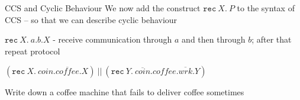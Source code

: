 \documentclass{beamer}
\begin{document}
\begin{frame}{CCS and Cyclic Behaviour}
  We now add the construct \alert{$\mathtt{rec}\ X.\ P$} to the syntax of CCS -- so that we
  can describe cyclic behaviour

  \vfill
  \begin{example}
    $\mathtt{rec}\ X.\ a . b . X$  - receive communication through $a$ and then
    through $b$; after that repeat protocol
  \end{example}

  \begin{example}
    $(\mathtt{rec}\ X.\ coin . \overline{coffee} . X)\ ||\ (\mathtt{rec}\ Y.\
    \overline{coin} .  coffee . \overline{wrk}. Y)$
  \end{example}

  \vfill
  Write down a coffee machine that fails to deliver coffee sometimes
\end{frame}
\end{document}
